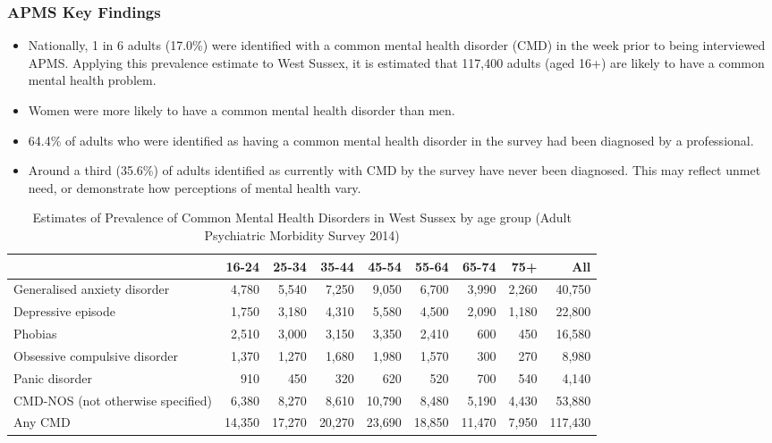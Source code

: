 \subsubsection{APMS Key Findings}
\begin{itemize}[noitemsep]
    \item Nationally, 1 in 6 adults (17.0\%) were identified with a common mental health disorder (CMD) in the week prior to being interviewed APMS. Applying this prevalence estimate to West Sussex, it is estimated that 117,400 adults (aged 16+) are likely to have a common mental health problem.
    \item Women were more likely to have a common mental health disorder than men.
    \item 64.4\% of adults who were identified as having a common mental health disorder in the survey had been diagnosed by a professional.
    \item Around a third (35.6\%) of adults identified as currently with CMD by the survey have never been diagnosed. This may reflect unmet need, or demonstrate how perceptions of mental health vary.
\end{itemize}

\begin{table}
    \caption{Estimates of Prevalence of Common Mental Health Disorders in West Sussex by age group (Adult Psychiatric Morbidity Survey 2014)}
    \centering
    \begin{tabular}{lrrrrrrrr}
        \toprule
        \ & 16-24 & 25-34 & 35-44 & 45-54 & 55-64 & 65-74 & 75+ & All \\
        \midrule
        Generalised anxiety disorder & 4,780 & 5,540 & 7,250 & 9,050 & 6,700 & 3,990 & 2,260 & 40,750 \\
        Depressive episode & 1,750 & 3,180 & 4,310 & 5,580 & 4,500 & 2,090 & 1,180 & 22,800 \\
        Phobias & 2,510 & 3,000 & 3,150 & 3,350 & 2,410 & 600 & 450 & 16,580 \\
        Obsessive compulsive disorder & 1,370 & 1,270 & 1,680 & 1,980 & 1,570 & 300 & 270 & 8,980 \\
        Panic disorder & 910 & 450 & 320 & 620 & 520 & 700 & 540 & 4,140 \\
        CMD-NOS (not otherwise specified) & 6,380 & 8,270 & 8,610 & 10,790 & 8,480 & 5,190 & 4,430 & 53,880 \\
        Any CMD & 14,350 & 17,270 & 20,270 & 23,690 & 18,850 & 11,470 & 7,950 & 117,430 \\
        \bottomrule
    \end{tabular}
    \label{tab:wa:cmd}
\end{table}


